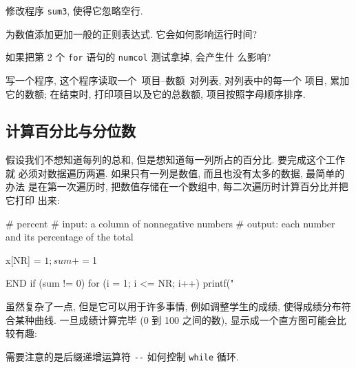 \begin{exercise}
    修改程序 \verb'sum3', 使得它忽略空行.
\end{exercise}
\begin{exercise}
    为数值添加更加一般的正则表达式. 它会如何影响运行时间?
\end{exercise}
\begin{exercise}
    如果把第 2 个 \verb'for' 语句的 \verb'numcol' 测试拿掉, 会产生什
    么影响?
\end{exercise}
\begin{exercise}
    写一个程序, 这个程序读取一个\ 项目--数额\ 对列表, 对列表中的每一个
项目, 累加它的数额; 在结束时, 打印项目以及它的总数额, 项目按照字母顺序排序.
\end{exercise}

\subsection{计算百分比与分位数}
\label{subsec:computing_percentages_and_quantiles}

假设我们不想知道每列的总和, 但是想知道每一列所占的百分比. 要完成这个工作就
必须对数据遍历两遍. 如果只有一列是数值, 而且也没有太多的数据, 最简单的办法
是在第一次遍历时, 把数值存储在一个数组中, 每二次遍历时计算百分比并把它打印
出来:
\begin{awkcode}
     # percent
     #   input:  a column of nonnegative numbers
     #   output: each number and its percentage of the total
     
         { x[NR] = $1; sum += $1 }
     
     END { if (sum != 0)
               for (i = 1; i <= NR; i++)
                   printf("%
         }
\end{awkcode}

虽然复杂了一点, 但是它可以用于许多事情, 例如调整学生的成绩, 使得成绩分布符
合某种曲线. 一旦成绩计算完毕 (0 到 100 之间的数), 显示成一个直方图可能会比
较有趣:
需要注意的是后缀递增运算符 \verb'--' 如何控制 \verb'while' 循环.

